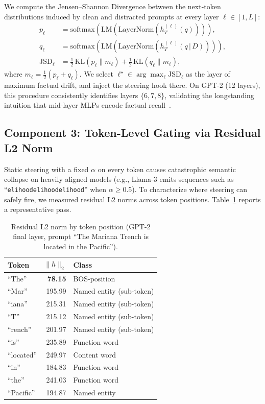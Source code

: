 \documentclass[conference]{IEEEtran}
\begin{document}
We compute the Jensen--Shannon Divergence between the next-token distributions induced by clean and distracted prompts at every layer $\ell \in [1, L]$:
\begin{align}
    p_\ell &= \mathrm{softmax}\!\left(\text{LM}(\text{LayerNorm}(h_{T}^{(\ell)}(q)))\right), \nonumber \\
    q_\ell &= \mathrm{softmax}\!\left(\text{LM}(\text{LayerNorm}(h_{T}^{(\ell)}(q\,|\,D)))\right), \nonumber \\
    \text{JSD}_\ell &= \tfrac{1}{2}\,\text{KL}(p_\ell\|m_\ell) + \tfrac{1}{2}\,\text{KL}(q_\ell\|m_\ell), \label{eq:jsd}
\end{align}
where $m_\ell = \tfrac{1}{2}(p_\ell+q_\ell)$. We select $\ell^\star \in \arg\max_\ell \text{JSD}_\ell$ as the layer of maximum factual drift, and inject the steering hook there. On GPT-2 (12 layers), this procedure consistently identifies layers $\{6,7,8\}$, validating the longstanding intuition that mid-layer MLPs encode factual recall~\cite{meng2022rome}.

\subsection{Component 3: Token-Level Gating via Residual L2 Norm}\label{sec:method-component3}

Static steering with a fixed $\alpha$ on every token causes catastrophic semantic collapse on heavily aligned models (e.g., Llama-3 emits sequences such as ``\texttt{elihoodelihoodelihood}'' when $\alpha \geq 0.5$). To characterize where steering can safely fire, we measured residual L2 norms across token positions. Table~\ref{tab:token-norms} reports a representative pass.

\begin{table}[htbp]
\caption{Residual L2 norm by token position (GPT-2 final layer, prompt ``The Mariana Trench is located in the Pacific'').}
\centering
\begin{tabular}{lrl}
\toprule
\textbf{Token} & \textbf{$\|h\|_2$} & \textbf{Class} \\
\midrule
``The''     & \textbf{78.15} & BOS-position \\
``Mar''     & 195.99 & Named entity (sub-token) \\
``iana''    & 215.31 & Named entity (sub-token) \\
``T''       & 215.12 & Named entity (sub-token) \\
``rench''   & 201.97 & Named entity (sub-token) \\
``is''      & 235.89 & Function word \\
``located'' & 249.97 & Content word \\
``in''      & 184.83 & Function word \\
``the''     & 241.03 & Function word \\
``Pacific'' & 194.87 & Named entity \\
\bottomrule
\end{tabular}
\label{tab:token-norms}
\end{table}
\end{document}
